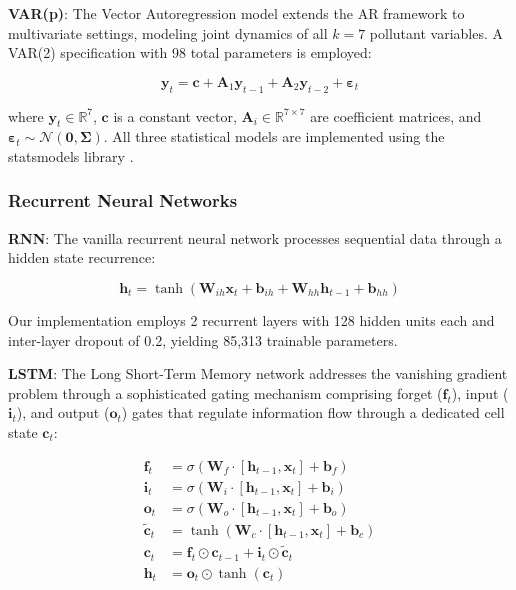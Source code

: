 \documentclass[conference]{IEEEtran}
\begin{document}
\textbf{VAR(p)}: The Vector Autoregression model extends the AR framework to multivariate settings, modeling joint dynamics of all $k=7$ pollutant variables. A VAR(2) specification with 98 total parameters is employed:

\begin{equation}
\mathbf{y}_t = \mathbf{c} + \mathbf{A}_1 \mathbf{y}_{t-1} + \mathbf{A}_2 \mathbf{y}_{t-2} + \boldsymbol{\varepsilon}_t
\label{eq:var}
\end{equation}

where $\mathbf{y}_t \in \mathbb{R}^{7}$, $\mathbf{c}$ is a constant vector, $\mathbf{A}_i \in \mathbb{R}^{7 \times 7}$ are coefficient matrices, and $\boldsymbol{\varepsilon}_t \sim \mathcal{N}(\mathbf{0}, \boldsymbol{\Sigma})$. All three statistical models are implemented using the statsmodels library \cite{seabold2010}.

\subsubsection{Recurrent Neural Networks}

\textbf{RNN}: The vanilla recurrent neural network processes sequential data through a hidden state recurrence:

\begin{equation}
\mathbf{h}_t = \tanh(\mathbf{W}_{ih}\mathbf{x}_t + \mathbf{b}_{ih} + \mathbf{W}_{hh}\mathbf{h}_{t-1} + \mathbf{b}_{hh})
\label{eq:rnn}
\end{equation}

Our implementation employs 2 recurrent layers with 128 hidden units each and inter-layer dropout of 0.2, yielding 85,313 trainable parameters.

\textbf{LSTM}: The Long Short-Term Memory network \cite{hochreiter1997} addresses the vanishing gradient problem through a sophisticated gating mechanism comprising forget ($\mathbf{f}_t$), input ($\mathbf{i}_t$), and output ($\mathbf{o}_t$) gates that regulate information flow through a dedicated cell state $\mathbf{c}_t$:

\begin{align}
\mathbf{f}_t &= \sigma(\mathbf{W}_f \cdot [\mathbf{h}_{t-1}, \mathbf{x}_t] + \mathbf{b}_f) \label{eq:lstm_f}\\
\mathbf{i}_t &= \sigma(\mathbf{W}_i \cdot [\mathbf{h}_{t-1}, \mathbf{x}_t] + \mathbf{b}_i) \label{eq:lstm_i}\\
\mathbf{o}_t &= \sigma(\mathbf{W}_o \cdot [\mathbf{h}_{t-1}, \mathbf{x}_t] + \mathbf{b}_o) \label{eq:lstm_o}\\
\tilde{\mathbf{c}}_t &= \tanh(\mathbf{W}_c \cdot [\mathbf{h}_{t-1}, \mathbf{x}_t] + \mathbf{b}_c)\\
\mathbf{c}_t &= \mathbf{f}_t \odot \mathbf{c}_{t-1} + \mathbf{i}_t \odot \tilde{\mathbf{c}}_t\\
\mathbf{h}_t &= \mathbf{o}_t \odot \tanh(\mathbf{c}_t)
\end{align}
\end{document}
